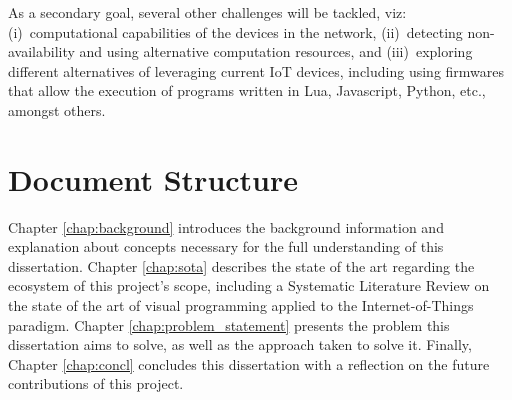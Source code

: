 As a secondary goal, several other challenges will be tackled, viz: (i)~computational capabilities of the devices in the network, (ii)~detecting non-availability and using alternative computation resources, and (iii)~exploring different alternatives of leveraging current IoT devices, including using firmwares that allow the execution of programs written in Lua, Javascript, Python, etc., amongst others.

\section{Document Structure} \label{sec:document structure}

Chapter \ref{chap:background} introduces the background information and explanation about concepts necessary for the full understanding of this dissertation. Chapter \ref{chap:sota} describes the state of the art regarding the ecosystem of this project's scope, including a Systematic Literature Review on the state of the art of visual programming applied to the Internet-of-Things paradigm. Chapter \ref{chap:problem_statement} presents the problem this dissertation aims to solve, as well as the approach taken to solve it. Finally, Chapter \ref{chap:concl} concludes this dissertation with a reflection on the future contributions of this project.


